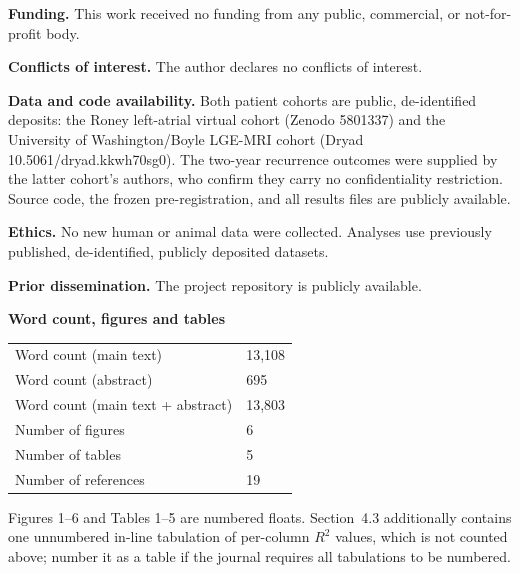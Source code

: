 \documentclass[11pt]{article}
\theoremstyle{definition}
\begin{document}
\smallskip
\noindent\textbf{Funding.} This work received no funding from any public,
commercial, or not-for-profit body.

\smallskip
\noindent\textbf{Conflicts of interest.} The author declares no conflicts of
interest.

\smallskip
\noindent\textbf{Data and code availability.} Both patient cohorts are public,
de-identified deposits: the Roney left-atrial virtual cohort (Zenodo 5801337) and
the University of Washington/Boyle LGE-MRI cohort (Dryad
10.5061/dryad.kkwh70sg0). The two-year recurrence outcomes were supplied by the
latter cohort's authors, who confirm they carry no confidentiality restriction.
Source code, the frozen pre-registration, and all results files are publicly
available.

\smallskip
\noindent\textbf{Ethics.} No new human or animal data were collected. Analyses
use previously published, de-identified, publicly deposited datasets.

\smallskip
\noindent\textbf{Prior dissemination.} The project repository is publicly
available.

\vspace{0.7em}
\noindent\textbf{Word count, figures and tables}

\smallskip
\begin{tabular}{@{}ll@{}}
\toprule
Word count (main text)            & 13{,}108 \\
Word count (abstract)             & 695 \\
Word count (main text + abstract) & 13{,}803 \\
Number of figures                 & 6 \\
Number of tables                  & 5 \\
Number of references              & 19 \\
\bottomrule
\end{tabular}

\smallskip
\noindent\footnotesize Figures 1--6 and Tables 1--5 are numbered floats.
Section~4.3 additionally contains one unnumbered in-line tabulation of per-column
$R^{2}$ values, which is not counted above; number it as a table if the journal
requires all tabulations to be numbered.\normalsize

\newpage
\end{document}
